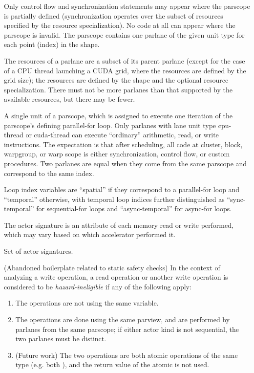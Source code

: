 Only control flow and synchronization statements may appear where the parscope is partially defined (synchronization operates over the subset of resources specified by the resource specialization).
No code at all can appear where the parscope is invalid.
The parscope contains one parlane of the given unit type for each point (index) in the shape.

The resources of a parlane are a subset of its parent parlane (except for the case of a CPU thread launching a CUDA grid, where the resources are defined by the grid size); the resources are defined by the shape and the optional resource specialization.
There must not be more parlanes than that supported by the available resources, but there may be fewer.

\filbreak
{} A single unit of a parscope, which is assigned to execute one iteration of the parscope's defining parallel-for loop.
Only parlanes with lane unit type cpu-thread or cuda-thread can execute ``ordinary'' arithmetic, read, or write instructions. 
The expectation is that after scheduling, all code at cluster, block, warpgroup, or warp scope is either synchronization, control flow, or custom procedures.
Two parlanes are equal when they come from the same parscope and correspond to the same index.

\filbreak
{} Loop index variables are ``spatial'' if they correspond to a parallel-for loop and ``temporal'' otherwise, with temporal loop indices further distinguished as ``sync-temporal'' for sequential-for loops and ``async-temporal'' for async-for loops.

\filbreak
{}
The actor signature is an attribute of each memory read or write performed, which may vary based on which accelerator performed it.

\filbreak
{}
Set of actor signatures.

\filbreak
{} (Abandoned boilerplate related to static safety checks) In the context of analyzing a write operation, a read operation or another write operation is considered to be \textit{hazard-ineligible} if any of the following apply:

\begin{enumerate}
  \item The operations are not using the same variable.
  \item The operations are done using the same parview, and are performed by parlanes from the same parscope; if either actor kind is not sequential, the two parlanes must be distinct.
  \item (Future work) The two operations are both atomic operations of the same type (e.g. both ), and the return value of the atomic is not used.
\end{enumerate}

